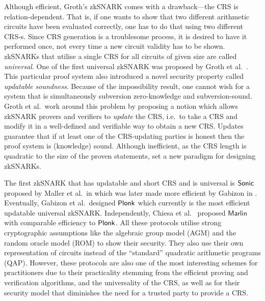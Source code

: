 \let\accentvec\vec \documentclass[runningheads]{llncs}
\begin{document}
Although efficient, Groth's zkSNARK comes with a drawback---the CRS is
relation-dependent. That is, if one wants to show that two different arithmetic circuits
have been evaluated correctly, one has to do that using two different CRS-s. 
Since CRS generation is a
troublesome process, it is desired to have it performed once, not every
time a new circuit validity has to be shown. zkSNARKs that utilise a single
CRS for all circuits of given size are called \emph{universal}. One of the first universal
zkSNARK was proposed by Groth et al.~\cite{C:GKMMM18}. This particular proof
system also introduced a novel security property called \emph{updatable
soundness}.
Because of the  \cite{AC:BelFucSca16} impossibility result, one cannot wish for a
system that is simultaneously subversion zero-knowledge and subversion-sound.
Groth et al.~work around this problem by proposing a notion which allows
zkSNARK provers and verifiers to \emph{update} the CRS, i.e.~to take a CRS and modify it
in a well-defined and verifiable way to obtain a new CRS. Updates guarantee 
that if at least one of the CRS-updating
parties is honest then the proof system is (knowledge) sound. Although inefficient, as the CRS length
is quadratic to the size of the proven statements, \cite{C:GKMMM18} set a new
paradigm for designing zkSNARKs.

The first zkSNARK that has updatable and short CRS and is universal is
${\textnormal{\textsf{Sonic}}}$ proposed by Maller et al.~in \cite{CCS:MBKM19} which was later
made more efficient by Gabizon in \cite{EPRINT:Gabizon19c}. Eventually, Gabizon et
al.~designed $\textnormal{\textsf{Plonk}}$ \cite{EPRINT:GabWilCio19} which currently is the
most efficient updatable universal zkSNARK. Independently, Chiesa et
al.~\cite{EC:CHMMVW20} proposed $\textsf{Marlin}$ with comparable efficiency to
$\textnormal{\textsf{Plonk}}$.
%
All these protocols utilise strong cryptographic assumptions like the
algebraic group model (AGM) and the random oracle model (ROM) to show their
security. They also use their own representation of circuits instead of the
``standard'' quadratic arithmetic programs (QAP). However, these protocols are also one of the  most interesting schemes
for practitioners due to their practicality stemming from the efficient
proving and verification algorithms, and the universality of the CRS, as well as for their
security model that diminishes the need for a trusted party to provide
a CRS.

\end{document}
